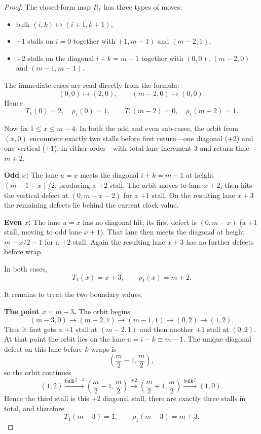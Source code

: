 \documentclass[11pt]{article}
\newcommand{\bulk}{\mathrm{bulk}}   %
\begin{document}
\begin{proof}
The closed-form map $R_1$ has three types of moves:
\begin{itemize}[leftmargin=2em]
\item bulk $(i,k)\mapsto(i+1,k+1)$,
\item $+1$ stalls on $i=0$ together with $(1,m-1)$ and $(m-2,1)$,
\item $+2$ stalls on the diagonal $i+k=m-1$ together with $(0,0)$, $(m-2,0)$ and $(m-1,m-1)$.
\end{itemize}

The immediate cases are read directly from the formula:
\[
(0,0)\mapsto(2,0),\qquad (m-2,0)\mapsto(0,0).
\]
Hence
\[
T_1(0)=2,\quad \rho_1(0)=1,\qquad T_1(m-2)=0,\quad \rho_1(m-2)=1.
\]

Now fix $1\le x\le m-4$.
In both the odd and even sub-cases, the orbit from $(x,0)$ encounters exactly two stalls before first return---one diagonal ($+2$) and one vertical ($+1$), in either order---with total lane increment $3$ and return time $m+2$.

\smallskip
\noindent\textbf{Odd $x$:}\enspace
The lane $u=x$ meets the diagonal $i+k=m-1$ at height $(m{-}1{-}x)/2$, producing a $+2$ stall.
The orbit moves to lane $x+2$, then hits the vertical defect at $(0,m{-}x{-}2)$ for a $+1$ stall.
On the resulting lane $x+3$ the remaining defects lie behind the current clock value.

\smallskip
\noindent\textbf{Even $x$:}\enspace
The lane $u=x$ has no diagonal hit; its first defect is $(0,m{-}x)$ (a $+1$ stall, moving to odd lane $x+1$).
That lane then meets the diagonal at height $m-x/2-1$ for a $+2$ stall.
Again the resulting lane $x+3$ has no further defects before wrap.

\smallskip\noindent
In both cases,
\[
T_1(x)=x+3,\qquad \rho_1(x)=m+2.
\]

It remains to treat the two boundary values.

\smallskip
\noindent\textbf{The point $x=m-3$.}
The orbit begins
\[
(m-3,0)\to (m-2,1)\to (m-1,1)\to (0,2)\to (1,2).
\]
Thus it first gets a $+1$ stall at $(m-2,1)$ and then another $+1$ stall at $(0,2)$.
At that point the orbit lies on the lane $u=i-k\equiv m-1$.
The unique diagonal defect on this lane before $k$ wraps is
\[
\left(\frac m2-1,\frac m2\right),
\]
so the orbit continues
\[
(1,2)\xrightarrow{\bulk^{\frac m2-2}}\left(\frac m2-1,\frac m2\right)
\xrightarrow{+2}\left(\frac m2+1,\frac m2\right)
\xrightarrow{\bulk^{\frac m2}}(1,0).
\]
Hence the third stall is this $+2$ diagonal stall, there are exactly three stalls in total, and therefore
\[
T_1(m-3)=1,\qquad \rho_1(m-3)=m+3.
\]


\end{proof}
\end{document}

